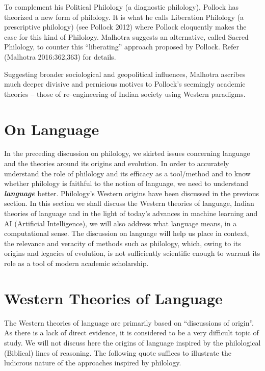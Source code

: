 To complement his Political Philology (a diagnostic philology), Pollock has theorized a new form of philology. It is what he calls Liberation Philology (a prescriptive philology) (see Pollock 2012) where Pollock eloquently makes the case for this kind of Philology. Malhotra suggests an alternative, called Sacred Philology, to counter this “liberating” approach proposed by Pollock. Refer (Malhotra 2016:362,363) for details.

Suggesting broader sociological and geopolitical influences, Malhotra ascribes much deeper divisive and pernicious motives to Pollock’s seemingly academic theories – those of re–engineering of Indian society using Western paradigms.


\section*{On Language}

\vskip -6pt

In the preceding discussion on philology, we skirted issues concerning language and the theories around its origins and evolution. In order to accurately understand the role of philology and its efficacy as a tool/method and to know whether philology is faithful to the notion of language, we need to understand \textbf{\textit{language}} better. Philology’s Western origins have been discussed in the previous section. In this section we shall discuss the Western theories of language, Indian theories of language and in the light of today’s advances in machine learning and AI (Artificial Intelligence), we will also address what language means, in a computational sense. The discussion on language will help us place in context, the relevance and veracity of methods such as philology, which, owing to its origins and legacies of evolution, is not sufficiently scientific enough to warrant its role as a tool of modern academic scholarship.


\section*{Western Theories of Language}

\vskip -6pt

The Western theories of language are primarily based on “discussions of origin”. As there is a lack of direct evidence, it is considered to be a very difficult topic of study. We will not discuss here the origins of language inspired by the philological (Biblical) lines of reasoning. The following quote suffices to illustrate the ludicrous nature of the approaches inspired by philology.

